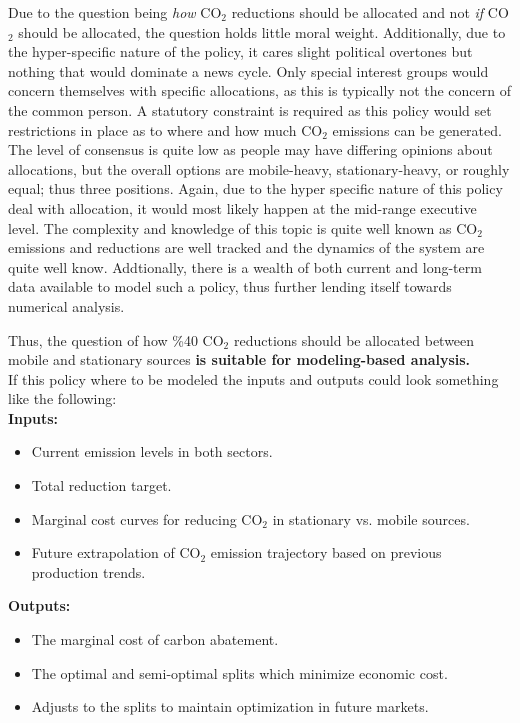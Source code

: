 \documentclass[journal, onecolumn, 12pt]{IEEEtran}
\begin{document}
\FloatBarrier
Due to the question being \textit{how} CO$_2$ reductions should be allocated and not \textit{if} CO$_2$ should be allocated, the question holds little moral weight. Additionally, due to the hyper-specific nature of the policy, it cares slight political overtones but nothing that would dominate a news cycle. Only special interest groups would concern themselves with specific allocations, as this is typically not the concern of the common person. A statutory constraint is required as this policy would set restrictions in place as to where and how much CO$_2$ emissions can be generated. The level of consensus is quite low as people may have differing opinions about allocations, but the overall options are mobile-heavy, stationary-heavy, or roughly equal; thus three positions. Again, due to the hyper specific nature of this policy deal with allocation, it would most likely happen at the mid-range executive level. The complexity and knowledge of this topic is quite well known as CO$_2$ emissions and reductions are well tracked and the dynamics of the system are quite well know. Addtionally, there is a wealth of both current and long-term data available to model such a policy, thus further lending itself towards numerical analysis.\par
Thus, the question of how \%40 CO$_2$ reductions should be allocated between mobile and stationary sources \textbf{is suitable for modeling-based analysis.} \\

If this policy where to be modeled the inputs and outputs could look something like the following: \\
 
\textbf{Inputs:}
\begin{itemize}
    \item Current emission levels in both sectors.
    \item Total reduction target.
    \item Marginal cost curves for reducing CO$_2$ in stationary vs. mobile sources.
    \item Future extrapolation of CO$_2$ emission trajectory based on previous production trends.\\
\end{itemize}

\textbf{Outputs:}
\begin{itemize}
    \item The marginal cost of carbon abatement. 
    \item The optimal and semi-optimal splits which minimize economic cost.
    \item Adjusts to the splits to maintain optimization in future markets. \\ 
\end{itemize}
\end{document}
